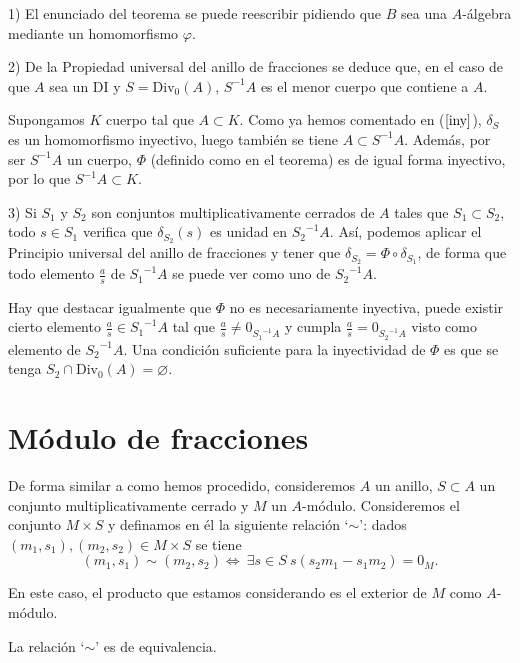 \documentclass[../main.tex]{subfiles}
\begin{document}
\begin{remark}
1) El enunciado del teorema se puede reescribir pidiendo que $B$ sea una $A$-álgebra mediante un homomorfismo $\varphi$.

2) De la Propiedad universal del anillo de fracciones se deduce que, en el caso de que $A$ sea un DI y $S=\operatorname{Div_0}(A)$, $S^{-1}A$ es el menor cuerpo que contiene a $A$.

Supongamos $K$ cuerpo tal que $A\subset K$. Como ya hemos comentado en ($\ref{iny}$), $\delta_S$ es un homomorfismo inyectivo, luego también se tiene $A\subset S^{-1}A$. Además, por ser $S^{-1}A$ un cuerpo, $\Phi$ (definido como en el teorema) es de igual forma inyectivo, por lo que $S^{-1}A\subset K$.

3) Si $S_1$ y $S_2$ son conjuntos multiplicativamente cerrados de $A$ tales que $S_1\subset S_2$, todo $s\in S_1$ verifica que $\delta_{S_2}(s)$ es unidad en ${S_2}^{-1}A$. Así, podemos aplicar el Principio universal del anillo de fracciones y tener que $\delta_{S_2}=\Phi\circ\delta_{S_1}$, de forma que todo elemento $\frac{a}{s}$ de ${S_1}^{-1}A$ se puede ver como uno de ${S_2}^{-1}A$.

Hay que destacar igualmente que $\Phi$ no es necesariamente inyectiva, puede existir cierto elemento $\frac{a}{s}\in{S_1}^{-1}A$ tal que $\frac{a}{s}\neq0_{{S_1}^{-1}A}$ y cumpla $\frac{a}{s}=0_{{S_2}^{-1}A}$ visto como elemento de ${S_2}^{-1}A$. Una condición suficiente para la inyectividad de $\Phi$ es que se tenga $S_2\cap\operatorname{Div_0}(A)=\varnothing$.

\section{Módulo de fracciones}
De forma similar a como hemos procedido, consideremos $A$ un anillo, $S\subset A$ un conjunto multiplicativamente cerrado y $M$ un $A$-módulo. Consideremos el conjunto $M\times S$ y definamos en él la siguiente relación `$\sim$': dados $(m_1,s_1),(m_2,s_2)\in M\times S$ se tiene
$$(m_1,s_1)\sim(m_2,s_2)\Longleftrightarrow\ \exists s\in S\ s(s_2m_1-s_1m_2)=0_M.$$

\begin{remark}
	En este caso, el producto que estamos considerando es el exterior de $M$ como $A$-módulo.
\end{remark}

\begin{proposition}
	La relación `$\sim$' es de equivalencia.
\end{proposition}


\end{remark}
\end{document}

